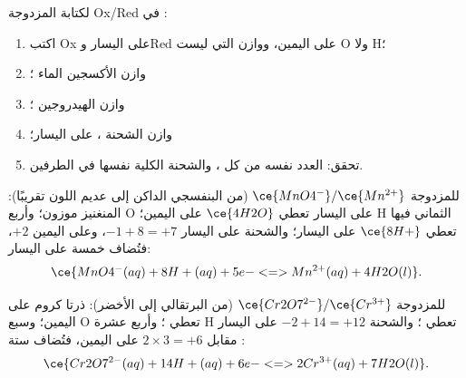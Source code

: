 \begin{method}\label{met:g11:redox:balance}
لكتابة  المزدوجة Ox/Red في :
\begin{enumerate}
  \item اكتب Ox على اليسار وRed على اليمين، ووازن 
        التي ليست O ولا H؛
  \item وازن  الأكسجين  الماء ؛
  \item وازن  الهيدروجين  ؛
  \item وازن الشحنة  ، على اليسار؛
  \item تحقق: العدد نفسه من كل ، والشحنة الكلية نفسها في
        الطرفين.
\end{enumerate}
\end{method}

\begin{example}\label{ex:g11:redox:permanganate}
للمزدوجة $\ce{MnO4^-}/\ce{Mn^{2+}}$ (من البنفسجي الداكن إلى عديم اللون
تقريبًا): المنغنيز موزون؛ وأربع  O على اليسار تعطي
$\ce{4H2O}$ على اليمين؛  H الثماني فيها تعطي $\ce{8H+}$ على اليسار؛
والشحنة على اليسار $-1 + 8 = +7$، وعلى اليمين $+2$، فتُضاف خمسة
 على اليسار:
\[
  \ce{MnO4^-(aq) + 8H+(aq) + 5e- <=> Mn^{2+}(aq) + 4H2O(l)}.
\]
\end{example}

\begin{example}\label{ex:g11:redox:dichromate}
للمزدوجة $\ce{Cr2O7^{2-}}/\ce{Cr^{3+}}$ (من البرتقالي إلى الأخضر): ذرتا كروم على
اليمين؛ وسبع  O تعطي ؛ وأربع عشرة  H تعطي ؛ والشحنة
$-2 + 14 = +12$ على اليسار مقابل $2 \times 3 = +6$ على اليمين، فتُضاف
ستة :
\[
  \ce{Cr2O7^{2-}(aq) + 14H+(aq) + 6e- <=> 2Cr^{3+}(aq) + 7H2O(l)}.
\]
\end{example}

